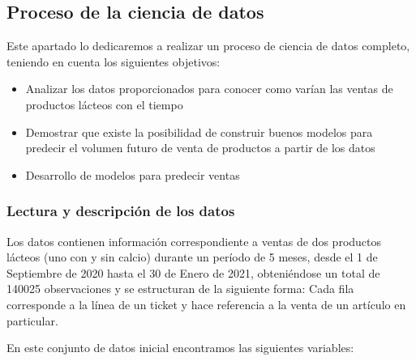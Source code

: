 \documentclass[
]{article}
\author{}
\date{\vspace{-2.5em}}
\providecommand{\tightlist}{%
  \setlength{\itemsep}{0pt}\setlength{\parskip}{0pt}}
\begin{document}
\ifdefined\ifprincipal
\else
\setlength{\parindent}{1em}
\pagestyle{fancy}
\setcounter{tocdepth}{4}
\tableofcontents

\fi

\ifdefined\ifdoblecara
\fancyhead{}{}
\fancyhead[LE,RO]{\scriptsize\rightmark}
\fancyfoot[LO,RE]{\scriptsize\slshape \leftmark}
\fancyfoot[C]{}
\fancyfoot[LE,RO]{\footnotesize\thepage}
\else
\fancyhead{}{}
\fancyhead[RO]{\scriptsize\rightmark}
\fancyfoot[LO]{\scriptsize\slshape \leftmark}
\fancyfoot[C]{}
\fancyfoot[RO]{\footnotesize\thepage}
\fi
\renewcommand{\headrulewidth}{0.4pt}
\renewcommand{\footrulewidth}{0.4pt}

\hypertarget{proceso-de-la-ciencia-de-datos}{%
\subsection{Proceso de la ciencia de
datos}\label{proceso-de-la-ciencia-de-datos}}

Este apartado lo dedicaremos a realizar un proceso de ciencia de datos
completo, teniendo en cuenta los siguientes objetivos:

\begin{itemize}
\tightlist
\item
  Analizar los datos proporcionados para conocer como varían las ventas
  de productos lácteos con el tiempo
\item
  Demostrar que existe la posibilidad de construir buenos modelos para
  predecir el volumen futuro de venta de productos a partir de los datos
\item
  Desarrollo de modelos para predecir ventas
\end{itemize}

\hypertarget{lectura-y-descripciuxf3n-de-los-datos}{%
\subsubsection{Lectura y descripción de los
datos}\label{lectura-y-descripciuxf3n-de-los-datos}}

Los datos contienen información correspondiente a ventas de dos
productos lácteos (uno con y sin calcio) durante un período de 5 meses,
desde el 1 de Septiembre de 2020 hasta el 30 de Enero de 2021,
obteniéndose un total de 140025 observaciones y se estructuran de la
siguiente forma: Cada fila corresponde a la línea de un ticket y hace
referencia a la venta de un artículo en particular.

En este conjunto de datos inicial encontramos las siguientes variables:
\end{document}
